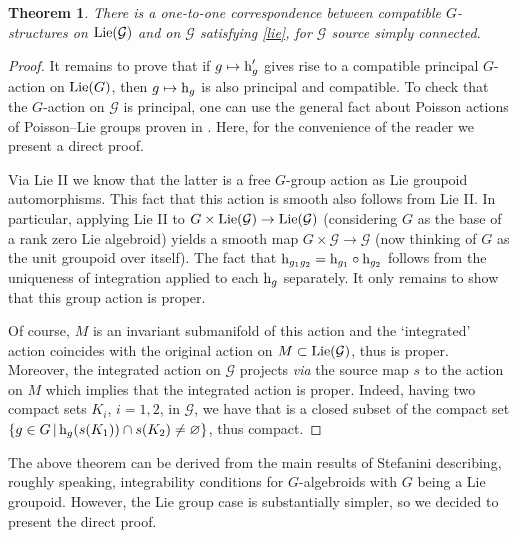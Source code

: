 \documentclass[10pt,a4paper]{amsart}
\newcommand{\rmh}{\textnormal{h}}
\newcommand{\Lie}{\textnormal{Lie}}
\def\cG{\mathcal{G}}
\numberwithin{equation}{section}
\newtheorem{Theorem}{Theorem}[section]
\begin{document}
 \begin{Theorem}\label{thm:lie theory01}
There is a one-to-one correspondence between compatible $G$-structures on $\Lie(\mathcal{G})$ and on $\mathcal{G}$ satisfying \eqref{lie}, for $\mathcal{G}$ source simply connected.
\end{Theorem}

\begin{proof}
It remains to prove that if $g\mapsto \rmh'_g$ gives rise to a compatible principal $G$-action on $\Lie(G)$, then $g\mapsto \rmh_g$ is also principal and compatible. To check that the $G$-action on $\mathcal{G}$ is principal, one can use the general fact about Poisson actions of Poisson--Lie groups proven in \cite[proof of Proposition~3.1]{Fernandes:2009}. Here, for the convenience of the reader we present a direct proof.

Via Lie II we know that the latter is a free $G$-group action as Lie groupoid automorphisms. This fact that this action is smooth also follows from Lie II. In particular, applying Lie II to $G \times \Lie(\cG) \rightarrow \Lie(\cG)$ (considering $G$ as the base of a rank zero Lie algebroid) yields a smooth map $G \times \cG \rightarrow \cG$ (now thinking of $G$ as the unit groupoid over itself). The fact that $\rmh_{g_1 g_2} = \rmh_{g_1} \circ \rmh_{g_2}$ follows from the uniqueness of integration applied to each $\rmh_g$ separately. It only remains to show that this group action is proper.

Of course, $M$ is an invariant submanifold of this action and the `integrated' action coincides with the original action on $M\subset \Lie(\cG)$, thus is proper. Moreover, the integrated action on $\mathcal{G}$ projects \emph{via} the source map $s$ to the action on $M$ which implies that the integrated action is proper. Indeed, having two compact sets $K_i$, $i=1,2$, in $\cG$, we have that \smash{$\{ g\in G\, |\, \rmh_g(K_1)\cap K_2\ne\varnothing\}$} is a closed subset of the compact set $\{ g\in G\, |\, \rmh_g(s(K_1))\cap s(K_2)\ne\varnothing\}$, thus compact.
\end{proof}

\begin{Remark}
The above theorem can be derived from the main results of Stefanini \cite{Stefanini:2007,Stefanini:2008} describing, roughly speaking, integrability conditions for $G$-algebroids with $G$ being a Lie groupoid. However, the Lie group case is substantially simpler, so we decided to present the direct proof.
\end{Remark}
\end{document}
